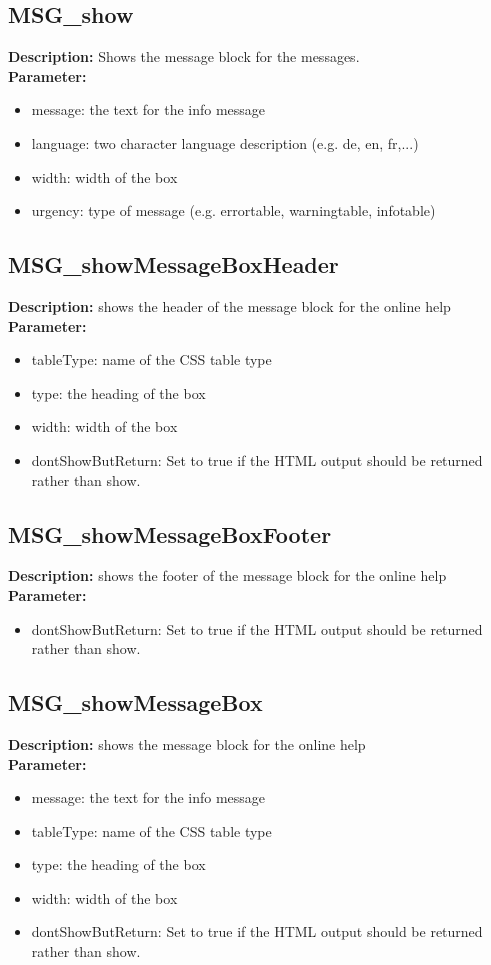 \subsection{MSG\_show}
\textbf{Description:} Shows the message block for the messages.\\
\textbf{Parameter:}
\begin{itemize}
\item message: the text for the info message
\item language: two character language description (e.g. de, en, fr,...)
\item width: width of the box
\item urgency: type of message (e.g. errortable, warningtable, infotable)
\end{itemize}

\subsection{MSG\_showMessageBoxHeader}
\textbf{Description:} shows the header of the message block for the online help\\
\textbf{Parameter:}
\begin{itemize}
\item tableType: name of the CSS table type
\item type: the heading of the box
\item width: width of the box
\item dontShowButReturn: Set to true if the HTML output should be returned rather than show.
\end{itemize}

\subsection{MSG\_showMessageBoxFooter}
\textbf{Description:} shows the footer of the message block for the online help\\
\textbf{Parameter:}
\begin{itemize}
\item dontShowButReturn: Set to true if the HTML output should be returned rather than show.
\end{itemize}

\subsection{MSG\_showMessageBox}
\textbf{Description:} shows the message block for the online help\\
\textbf{Parameter:}
\begin{itemize}
\item message: the text for the info message
\item tableType: name of the CSS table type
\item type: the heading of the box
\item width: width of the box
\item dontShowButReturn: Set to true if the HTML output should be returned rather than show.
\end{itemize}

